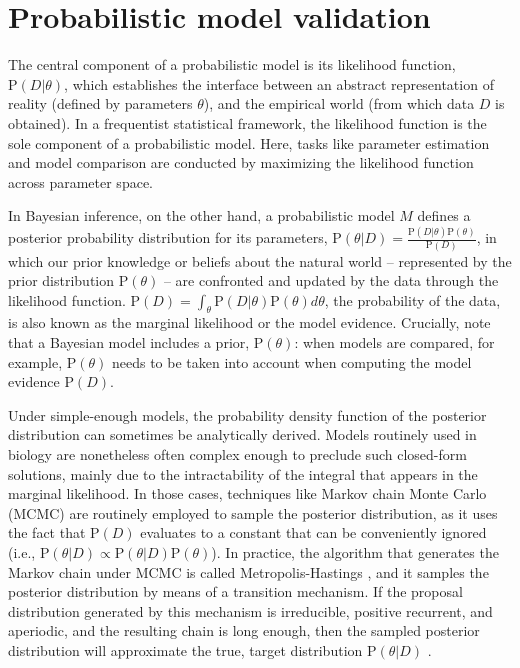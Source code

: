 \documentclass[oneside]{article}
\begin{document}
\section*{Probabilistic model validation}

The central component of a probabilistic model is its likelihood
function, $\text{P}(D|\theta)$, which establishes the
interface between an abstract representation of reality (defined by parameters $\theta$), and the
empirical world (from which data $D$ is obtained).
In a frequentist statistical framework, the likelihood function is the sole
component of a probabilistic model.
Here, tasks like parameter estimation and model comparison are conducted
by maximizing the likelihood function across parameter
space.

In Bayesian inference, on the other hand, a probabilistic model $M$
defines a posterior probability distribution for its parameters,
$\text{P}(\theta|D) = \frac{\text{P}(D|\theta)\text{P}(\theta)}{\text{P}(D)}$, in which our prior
knowledge or beliefs about the natural world -- represented by the prior
distribution $\text{P}(\theta)$ -- are confronted and updated by the data through the
likelihood function.
$\text{P}(D) = \int_\theta \text{P}(D|\theta)\text{P}(\theta)d\theta$, the probability of
the data, is also known as the marginal likelihood or the model
evidence.
Crucially, note that a Bayesian model includes a prior, $\text{P}(\theta)$:
when models are compared, for example, $\text{P}(\theta)$ needs to be taken
into account when computing the model evidence $\text{P}(D)$.

Under simple-enough models, the probability density function of the posterior distribution can sometimes be analytically
derived.
Models routinely used in biology are nonetheless often complex enough
to preclude such closed-form solutions, mainly due to the
intractability of the integral that appears in the marginal
likelihood.
In those cases, techniques like Markov chain Monte Carlo (MCMC) are
routinely employed to sample the posterior distribution, as it uses
the fact that $\text{P}(D)$ evaluates to a constant that can be
conveniently ignored (i.e., $\text{P}(\theta|D) \propto
\text{P}(\theta|D)\text{P}(\theta)$).
In practice, the algorithm that generates the Markov chain under MCMC is called
Metropolis-Hastings \citep{mh}, and it samples the posterior distribution by
means of a transition mechanism. 
If the proposal distribution generated by this mechanism is
irreducible, positive recurrent, and aperiodic, and the resulting
chain is long enough, then the sampled posterior distribution will approximate the true, target
distribution $\text{P}(\theta|D)$ \citep{smith93,tierney94,gelman}.
\end{document}
